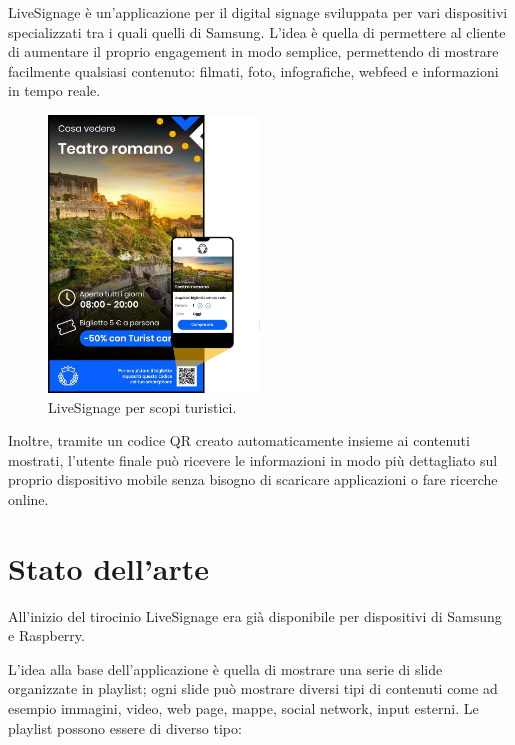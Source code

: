 LiveSignage è un’applicazione per il digital signage sviluppata per vari dispositivi specializzati tra i quali quelli di Samsung. L’idea è quella di permettere al cliente di aumentare il proprio engagement in modo semplice, permettendo di mostrare facilmente qualsiasi contenuto: filmati, foto, infografiche, webfeed e informazioni in tempo reale.

\begin{figure}[!htb]
    \centering
    \includegraphics[width= 0.5\textwidth]{images/Introduzione/LiveTurist.jpg} 
    \caption{LiveSignage per scopi turistici.} 
\end{figure}

Inoltre, tramite un codice QR creato automaticamente insieme ai contenuti mostrati, l'utente finale può ricevere le informazioni in modo più dettagliato sul proprio dispositivo mobile senza bisogno di scaricare applicazioni o fare ricerche online.


\section{Stato dell'arte}
All'inizio del tirocinio LiveSignage era già disponibile per dispositivi di Samsung e Raspberry.  

L'idea alla base dell'applicazione è quella di mostrare una serie di slide organizzate in playlist; ogni slide può mostrare diversi tipi di contenuti come ad esempio immagini, video, web page, mappe, social network, input esterni. Le playlist possono essere di diverso tipo:

